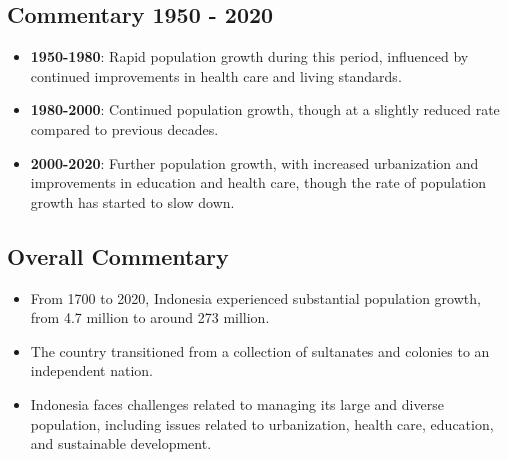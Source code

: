 \subsection*{Commentary 1950 - 2020}
\begin{itemize}
    \item \textbf{1950-1980}: Rapid population growth during this period, influenced by continued improvements in health care and living standards.
    \item \textbf{1980-2000}: Continued population growth, though at a slightly reduced rate compared to previous decades.
    \item \textbf{2000-2020}: Further population growth, with increased urbanization and improvements in education and health care, though the rate of population growth has started to slow down.
\end{itemize}

\subsection*{Overall Commentary}
\begin{itemize}
    \item From 1700 to 2020, Indonesia experienced substantial population growth, from 4.7 million to around 273 million.
    \item The country transitioned from a collection of sultanates and colonies to an independent nation.
    \item Indonesia faces challenges related to managing its large and diverse population, including issues related to urbanization, health care, education, and sustainable development.
\end{itemize}